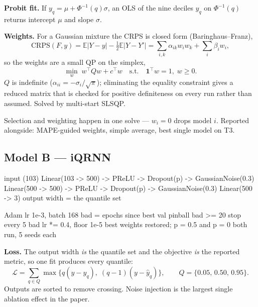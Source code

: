 \documentclass[11pt,a4paper]{article}
\newcommand{\yhat}{\hat{y}}
\begin{document}
\noindent
\textbf{Probit fit.} If $y_q = \mu + \Phi^{-1}(q)\sigma$, an OLS of the nine deciles $y_q$ on
$\Phi^{-1}(q)$ returns intercept $\mu$ and slope $\sigma$.

\medskip
\noindent
\textbf{Weights.} For a Gaussian mixture the CRPS is closed form (Baringhaus--Franz),
\begin{equation}
  \mathrm{CRPS}(F,y) = \mathbb{E}|Y-y| - \tfrac12 \mathbb{E}|Y-Y'|
  = \sum_{i,k} \alpha_{ik} w_i w_k + \sum_i \beta_i w_i ,
\end{equation}
so the weights are a small QP on the simplex,
\begin{equation}
  \min_{w}\; w^{\top} Q w + c^{\top} w
  \quad\text{s.t.}\quad \mathbf{1}^{\top} w = 1,\; w \geq 0 .
\end{equation}
$Q$ is indefinite ($\alpha_{ii} = -\sigma_i/\sqrt{\pi}$); eliminating the equality constraint
gives a reduced matrix that is checked for positive definiteness on every run rather than
assumed. Solved by multi-start SLSQP.

\medskip
\noindent
Selection and weighting happen in one solve --- $w_i = 0$ drops model $i$. Reported alongside:
MAPE-guided weights, simple average, best single model on T3.

\subsection{Model B --- iQRNN}

\begin{code}
input (103)
  Linear(103 -> 500) -> PReLU -> Dropout(p) -> GaussianNoise(0.3)
  Linear(500 -> 500) -> PReLU -> Dropout(p) -> GaussianNoise(0.3)
  Linear(500 ->   3)                     output width = the quantile set

  Adam lr 1e-3, batch 168
  bad = epochs since best val pinball
      bad >= 20         stop
      every 5 bad       lr *= 0.4, floor 1e-5
  best weights restored;  p = 0.5 and p = 0 both run, 5 seeds each
\end{code}

\noindent
\textbf{Loss.} The output width \emph{is} the quantile set and the objective \emph{is} the
reported metric, so one fit produces every quantile:
\begin{equation}
  \mathcal{L} = \sum_{q \in Q} \max\!\big\{ q(y - \yhat_q),\; (q-1)(y - \yhat_q) \big\},
  \qquad Q = \{0.05,\,0.50,\,0.95\} .
\end{equation}
Outputs are sorted to remove crossing. Noise injection is the largest single ablation effect
in the paper.
\end{document}
